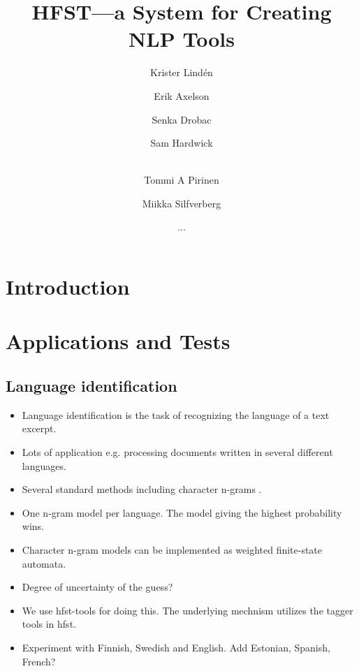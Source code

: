 \documentclass{llncs}
\begin{document}
%
\title{HFST---a System for Creating NLP Tools}
%
\author{Krister Lind\'{e}n \and Erik Axelson \and Senka Drobac \and Sam Hardwick \and\\
Tommi A Pirinen \and Miikka Silfverberg \and ...}


\maketitle


\begin{abstract}
\end{abstract}


\section*{Introduction}

\section{Applications and Tests}\label{hfst:structural-layout}

\subsection{Language identification}
\begin{itemize}
\item Language identification is the task of recognizing the language
  of a text excerpt.
\item Lots of application e.g. processing documents written in several
  different languages.
\item Several standard methods including character n-grams \cite{cavnar/1994}.
\item One n-gram model per language. The model giving the highest
  probability wins.
\item Character n-gram models can be implemented as weighted
  finite-state automata.
\item Degree of uncertainty of the guess? 
\item We use hfst-tools for doing this. The underlying mechnism
  utilizes the tagger tools in hfst.
\item Experiment with Finnish, Swedish and English. Add Estonian,
  Spanish, French?
\end{itemize}
\end{document}
